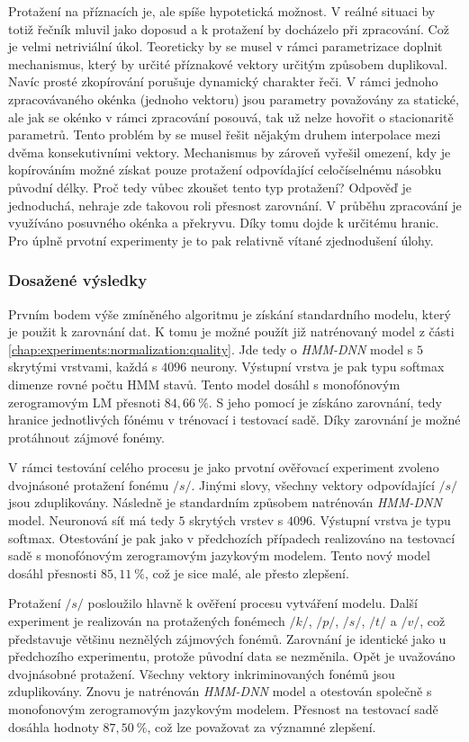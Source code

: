 Protažení na příznacích je, ale spíše hypotetická možnost. V reálné situaci by totiž řečník mluvil jako doposud a k protažení by docházelo při zpracování. Což je velmi netriviální úkol. Teoreticky by se musel v rámci parametrizace doplnit mechanismus, který by určité příznakové vektory určitým způsobem duplikoval. Navíc prosté zkopírování porušuje dynamický charakter řeči. V rámci jednoho zpracovávaného okénka (jednoho vektoru) jsou parametry považovány za statické, ale jak se okénko v rámci zpracování posouvá, tak už nelze hovořit o stacionaritě parametrů. Tento problém by se musel řešit nějakým druhem interpolace mezi dvěma konsekutivními vektory. Mechanismus by zároveň vyřešil omezení, kdy je kopírováním možné získat pouze protažení odpovídající celočíselnému násobku původní délky. Proč tedy vůbec zkoušet tento typ protažení? Odpověď je jednoduchá, nehraje zde takovou roli přesnost zarovnání. V průběhu zpracování je využíváno posuvného okénka a překryvu. Díky tomu dojde k určitému  hranic. Pro úplně prvotní experimenty je to pak relativně vítané zjednodušení úlohy.

\subsubsection{Dosažené výsledky}

Prvním bodem výše zmíněného algoritmu je získání standardního modelu, který je použit k zarovnání dat. K tomu je možné použít již natrénovaný model z části \ref{chap:experiments:normalization:quality}. Jde tedy o \textit{HMM-DNN} model s $5$ skrytými vrstvami, každá s $4096$ neurony. Výstupní vrstva je pak typu softmax dimenze rovné počtu HMM stavů. Tento model dosáhl s monofónovým zerogramovým LM přesnoti $84,66\ \%$. S jeho pomocí je získáno zarovnání, tedy hranice jednotlivých fónému v trénovací i testovací sadě. Díky zarovnání je možné protáhnout zájmové fonémy.

V rámci testování celého procesu je jako prvotní ověřovací experiment zvoleno dvojnásoné protažení fonému $/s/$. Jinými slovy, všechny vektory odpovídající $/s/$ jsou zduplikovány. Následně je standardním způsobem natrénován \textit{HMM-DNN} model. Neuronová síť má tedy $5$ skrytých vrstev s $4096$. Výstupní vrstva je typu softmax. Otestování je pak jako v předchozích případech realizováno na testovací sadě s monofónovým zerogramovým jazykovým modelem. Tento nový model dosáhl přesnosti $85,11\ \%$, což je sice malé, ale přesto zlepšení.

Protažení $/s/$ posloužilo hlavně k ověření procesu vytváření modelu. Další experiment je realizován na protažených fonémech $/k/$, $/p/$, $/s/$, $/t/$ a $/v/$, což představuje většinu neznělých zájmových fonémů. Zarovnání je identické jako u předchozího experimentu, protože původní data se nezměnila. Opět je uvažováno dvojnásobné protažení. Všechny vektory inkriminovaných fonémů jsou zduplikovány. Znovu je natrénován \textit{HMM-DNN} model a otestován společně s monofonovým zerogramovým jazykovým modelem. Přesnost na testovací sadě dosáhla hodnoty $87,50\ \%$, což lze považovat za významné zlepšení.

